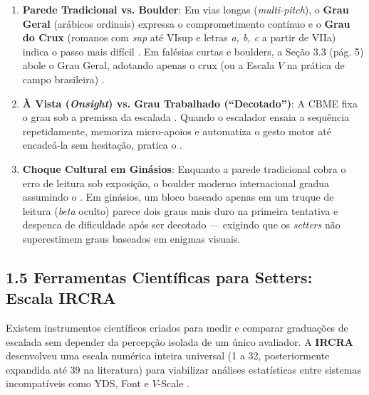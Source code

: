 \begin{enumerate}
    \item \textbf{Parede Tradicional vs. Boulder}: Em vias longas (\textit{multi-pitch}), o \textbf{Grau Geral} (arábicos ordinais) expressa o comprometimento contínuo e o \textbf{Grau do Crux} (romanos com \textit{sup} até VIsup e letras \textit{a, b, c} a partir de VIIa) indica o passo mais difícil \cite{cbme_dt01}. Em falésias curtas e boulders, a Seção 3.3 (pág. 5) abole o Grau Geral, adotando apenas o crux (ou a Escala $V$ na prática de campo brasileira) \cite{cbme_dt01, guia_cocalzinho, guia_igatu}.
    \item \textbf{À Vista (\textit{Onsight}) vs. Grau Trabalhado (``Decotado'')}: A CBME fixa o grau sob a premissa da escalada  \cite{cbme_dt01}. Quando o escalador ensaia a sequência repetidamente, memoriza micro-apoios e automatiza o gesto motor até encadeá-la sem hesitação, pratica o .
    \item \textbf{Choque Cultural em Ginásios}: Enquanto a parede tradicional cobra o erro de leitura sob exposição, o boulder moderno internacional gradua assumindo o . Em ginásios, um bloco baseado apenas em um truque de leitura (\textit{beta} oculto) parece dois graus mais duro na primeira tentativa e despenca de dificuldade após ser decotado — exigindo que os \textit{setters} não superestimem graus baseados em enigmas visuais.
\end{enumerate}

\subsection*{1.5 Ferramentas Científicas para Setters: Escala IRCRA}

Existem instrumentos científicos criados para medir e comparar graduações de escalada sem depender da percepção isolada de um único avaliador. A \textbf{IRCRA} desenvolveu uma escala numérica inteira universal (1 a 32, posteriormente expandida até 39 na literatura) para viabilizar análises estatísticas entre sistemas incompatíveis como YDS, Font e $V$-Scale \cite{ircra_draper, pmc_ric_study}.

